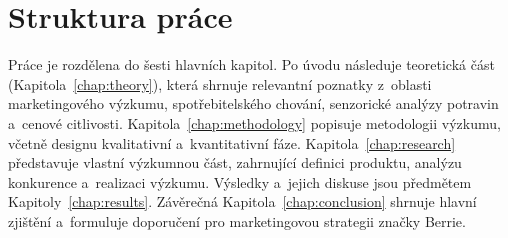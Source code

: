 \section{Struktura práce}

Práce je rozdělena do šesti hlavních kapitol. Po úvodu následuje teoretická část (Kapitola~\ref{chap:theory}), která shrnuje relevantní poznatky z~oblasti marketingového výzkumu, spotřebitelského chování, senzorické analýzy potravin a~cenové citlivosti. Kapitola~\ref{chap:methodology} popisuje metodologii výzkumu, včetně designu kvalitativní a~kvantitativní fáze. Kapitola~\ref{chap:research} představuje vlastní výzkumnou část, zahrnující definici produktu, analýzu konkurence a~realizaci výzkumu. Výsledky a~jejich diskuse jsou předmětem Kapitoly~\ref{chap:results}. Závěrečná Kapitola~\ref{chap:conclusion} shrnuje hlavní zjištění a~formuluje doporučení pro marketingovou strategii značky Berrie.
